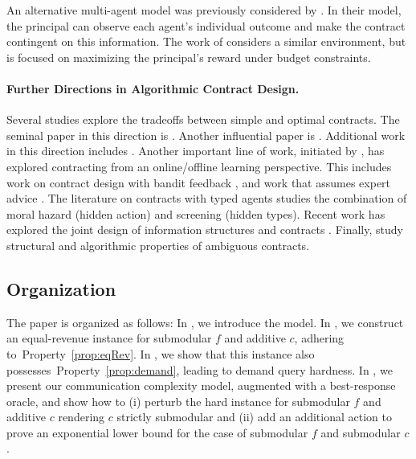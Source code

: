 \documentclass[11pt]{article}
\begin{document}
An alternative multi-agent model was previously considered by \cite{CastiglioniM023}. In their model, the principal can observe each agent's individual outcome and make the contract contingent on this information. The work of \cite{hann2024optimality} considers a similar environment, but is focused on maximizing the principal's reward under budget constraints. 

\paragraph{Further Directions in Algorithmic Contract Design.}
Several studies explore the tradeoffs between simple and optimal contracts. The seminal paper in this direction is \cite{carroll2015robustness}. Another influential paper is \cite{dutting2019simple}. Additional work in this direction includes \cite{dutting2022combinatorial,CarrollW22,DaiToikka22,AnticG23,Kambhampati23,peng2024optimal}. 
Another important line of work, initiated by \cite{ho2014adaptive}, has explored contracting from an online/offline learning perspective. 
This includes work on contract design with bandit feedback  \cite{ZhuBYWJJ23,BacchiocchiC0024,ivanov2024principal}, and work that assumes expert advice \cite{DuettingGuruganeshSchneiderWang23,duetting2025pseudodimensioncontracts}.
The literature on contracts with typed agents  \cite{guruganesh2021contracts, GuruganeshSW023,CastiglioniM021, castiglioni2022designing,alon2021contracts,AlonDLT23,CastiglioniCLXZ25}
studies the combination of moral hazard (hidden action) and screening (hidden types). Recent work has explored the joint design of information structures and contracts \cite{BabichenkoEtAl2024,CastiglioniC25}. Finally, \cite{dutting2024ambiguous,DFR25} study structural and algorithmic properties of ambiguous contracts.

\subsection{Organization}

The paper is organized as follows:
In , we introduce the model. 
In , we construct an equal-revenue instance for submodular $f$ and additive $c$, adhering to~Property~\ref{prop:eqRev}. In
, we show that this instance also possesses~Property~\ref{prop:demand}, leading to demand query hardness. 
In , we present our communication complexity model, augmented with a best-response oracle, and show how to (i) perturb the hard instance for submodular $f$ and additive $c$ rendering $c$ strictly submodular and (ii) add an additional action to prove an exponential lower bound for the case of submodular $f$ and submodular $c$. 
\end{document}
